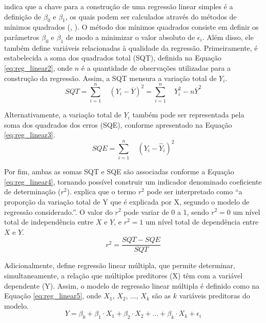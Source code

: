  indica que a chave para a construção de uma regressão linear simples é a definição de $\beta_{0}$ e $\beta_{1}$, os quais podem ser calculados através do métodos de mínimos quadrados (, \citeyear{BJORCK1990465}).
O método dos mínimos quadrados consiste em definir os parâmetros $\beta_{0}$ e $\beta_{1}$ de modo a minimizar o valor absoluto de $\epsilon_{i}$. 
Além disso, ele também define variáveis relacionadas à qualidade da regressão. 
Primeiramente, é estabelecida a soma dos quadrados total (SQT), definida na Equação \ref{eq:reg_linear2}, onde $n$ é a quantidade de observações utilizadas para a construção da regressão. 
Assim, a SQT mensura a variação total de $Y_{i}$.
%
\begin{equation} \label{eq:reg_linear2}
    SQT = \sum_{i=1}^{n} \quad (Y_{i} - \overline{Y})^2 = \sum_{i=1}^{n} \quad Y_{i}^2 - n\overline{Y}^2
\end{equation}

Alternativamente, a variação total de $Y_{i}$ também pode ser representada pela soma dos quadrados dos erros (SQE), conforme apresentado na Equação \ref{eq:reg_linear3}.
%
\begin{equation} \label{eq:reg_linear3}
    SQE = \sum_{i=1}^{n} \quad (Y_{i} - \hat{Y}_{i})^2
\end{equation}

Por fim, ambas as somas SQT e SQE são associadas conforme a Equação \ref{eq:reg_linear4}, tornando possível construir um indicador denominado coeficiente de determinação ($r^2$). 
 explica que o termo $r^2$ pode ser interpretado como ``a proporção da variação total de Y que é explicada por X, segundo o modelo de regressão considerado.''.
O valor do $r^2$ pode variar de 0 a 1, sendo $r^{2}=0$ um nível total de independência entre $X$ e $Y$, e $r^{2}=1$ um nível total de dependência entre $X$ e $Y$.
%
\begin{equation} \label{eq:reg_linear4}
    r^2 = \frac{SQT-SQE}{SQT}
\end{equation}

Adicionalmente,  define regressão linear múltipla, que permite determinar, simultaneamente, a relação que múltiplos preditores (X) têm com a variável dependente (Y). 
Assim, o modelo de regressão linear múltipla é definido como na Equação \ref{eq:reg_linear5}, onde $X_{1}$, $X_{2}$, ..., $X_{k}$ são as $k$ variáveis preditoras do modelo.
%
\begin{equation} \label{eq:reg_linear5}
    Y = \beta_{0}+ \beta_{1} \cdot X_{1} + \beta_{2} \cdot X_{2} + ... + \beta_{k} \cdot X_{k} + \epsilon_{i}
\end{equation}

